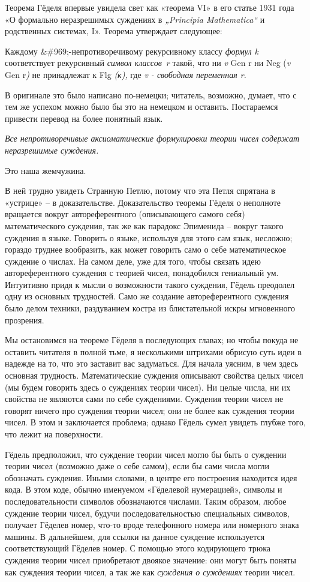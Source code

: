 \documentclass[../main.tex]{subfiles}
\begin{document}
Теорема Гёделя впервые увидела свет как «теорема VI» в его статье 1931 года «О формально неразрешимых суждениях в \emph{„Principia Mathematica``} и родственных системах, I». Теорема утверждает следующее:

Каждому \&\#969;-непротиворечивому рекурсивному классу \emph{формул k} соответствует рекурсивный \emph{символ классов~r} такой, что ни \emph{v} Gen r ни Neg (\emph{v} Gen r\emph{)} не принадлежат к Flg \emph{(к),} где \emph{v - свободная переменная r.}

В оригинале это было написано по-немецки; читатель, возможно, думает, что с тем же успехом можно было бы это на немецком и оставить. Постараемся привести перевод на более понятный язык.

\emph{Все непротиворечивые аксиоматические формулировки теории чисел содержат неразрешимые суждения.}

Это наша жемчужина.

В ней трудно увидеть Странную Петлю, потому что эта Петля спрятана в «устрице» \--- в доказательстве. Доказательство теоремы Гёделя о неполноте вращается вокруг автореферентного (описывающего самого себя) математического суждения, так же как парадокс Эпименида \--- вокруг такого суждения в языке. Говорить о языке, используя для этого сам язык, несложно; гораздо труднее вообразить, как может говорить само о себе математическое суждение о числах. На самом деле, уже для того, чтобы связать идею автореферентного суждения с теорией чисел, понадобился гениальный ум. Интуитивно придя к мысли о возможности такого суждения, Гёдель преодолел одну из основных трудностей. Само же создание автореферентного суждения было делом техники, раздуванием костра из блистательной искры мгновенного прозрения.

Мы остановимся на теореме Гёделя в последующих главах; но чтобы покуда не оставить читателя в полной тьме, я несколькими штрихами обрисую суть идеи в надежде на то, что это заставит вас задуматься. Для начала уясним, в чем здесь основная трудность. Математические суждения описывают свойства целых чисел (мы будем говорить здесь о суждениях теории чисел). Ни целые числа, ни их свойства не являются сами по себе суждениями. Суждения теории чисел не говорят ничего про суждения теории чисел; они не более как суждения теории чисел. В этом и заключается проблема; однако Гёдель сумел увидеть глубже того, что лежит на поверхности.

Гёдель предположил, что суждение теории чисел могло бы быть о суждении теории чисел (возможно даже о себе самом), если бы сами числа могли обозначать суждения. Иными словами, в центре его построения находится идея кода. В этом коде, обычно именуемом «Гёделевой нумерацией», символы и последовательности символов обозначаются числами. Таким образом, любое суждение теории чисел, будучи последовательностью специальных символов, получает Гёделев номер, что-то вроде телефонного номера или номерного знака машины. В дальнейшем, для ссылки на данное суждение используется соответствующий Гёделев номер. С помощью этого кодирующего трюка суждения теории чисел приобретают двоякое значение: они могут быть поняты как суждения теории чисел, а так же как \emph{суждения о суждениях} теории чисел.
\end{document}
